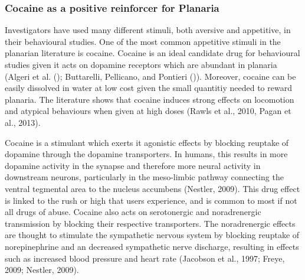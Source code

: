 \documentclass[
  letterpaper,
  DIV=11,
  numbers=noendperiod,
  oneside]{scrartcl}
\begin{document}
\subsubsection{Cocaine as a positive reinforcer for
Planaria}\label{cocaine-as-a-positive-reinforcer-for-planaria}

Investigators have used many different stimuli, both aversive and
appetitive, in their behavioural studies. One of the most common
appetitive stimuli in the planarian literature is cocaine. Cocaine is an
ideal candidate drug for behavioural studies given it acts on dopamine
receptors which are abundant in planaria (Algeri et al.
(); Buttarelli, Pellicano, and Pontieri
()). Moreover,
cocaine can be easily dissolved in water at low cost given the small
quantitiy needed to reward planaria. The literature shows that cocaine
induces strong effects on locomotion and atypical behaviours when given
at high doses (Rawls et al., 2010, Pagan et al., 2013).

Cocaine is a stimulant which exerts it agonistic effects by blocking
reuptake of dopamine through the dopamine transporters. In humans, this
results in more dopamine activity in the synapse and therefore more
neural activity in downstream neurons, particularly in the meso-limbic
pathway connecting the ventral tegmental area to the nucleus accumbens
(Nestler, 2009). This drug effect is linked to the rush or high that
users experience, and is common to most if not all drugs of abuse.
Cocaine also acts on serotonergic and noradrenergic transmission by
blocking their respective transporters. The noradrenergic effects are
thought to stimulate the sympathetic nervous system by blocking reuptake
of norepinephrine and an decreased sympathetic nerve discharge,
resulting in effects such as increased blood pressure and heart rate
(Jacobson et al., 1997; Freye, 2009; Nestler, 2009).
\end{document}
